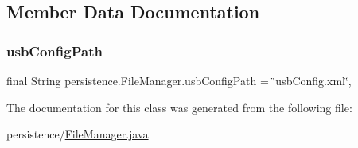 \subsection{Member Data Documentation}
\mbox{\label{classpersistence_1_1_file_manager_a41f3194a363708961b2e56f3f93c3786}} 
\subsubsection{\texorpdfstring{usb\+Config\+Path}{usbConfigPath}}
{\footnotesize\ttfamily final String persistence.\+File\+Manager.\+usb\+Config\+Path = \char`\"{}usb\+Config.\+xml\char`\"{}\hspace{0.3cm}{\ttfamily [static]}, {\ttfamily [private]}}



The documentation for this class was generated from the following file\+:\begin{DoxyCompactItemize}
\item 
persistence/\mbox{\hyperlink{_file_manager_8java}{File\+Manager.\+java}}\end{DoxyCompactItemize}
